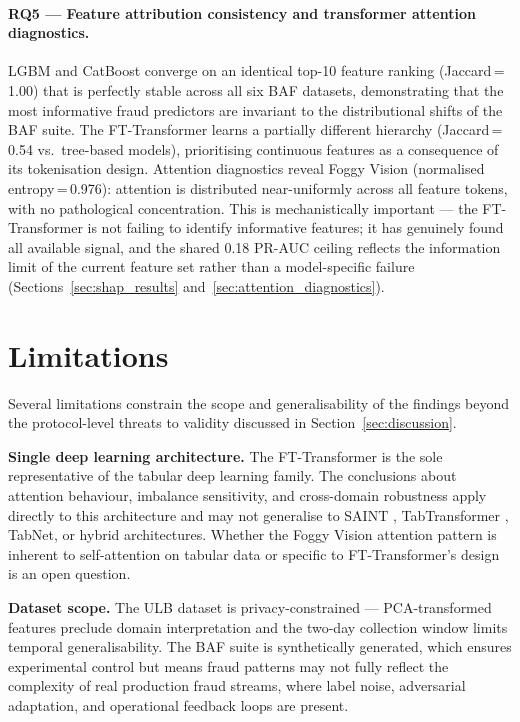 \paragraph{RQ5 — Feature attribution consistency and transformer attention diagnostics.}
LGBM and CatBoost converge on an identical top-10 feature ranking (Jaccard\,=\,1.00) that is perfectly stable across all six BAF datasets, demonstrating that the most informative fraud predictors are invariant to the distributional shifts of the BAF suite. The FT-Transformer learns a partially different hierarchy (Jaccard\,=\,0.54 vs.\ tree-based models), prioritising continuous features as a consequence of its tokenisation design. Attention diagnostics reveal Foggy Vision (normalised entropy\,=\,0.976): attention is distributed near-uniformly across all feature tokens, with no pathological concentration. This is mechanistically important — the FT-Transformer is not failing to identify informative features; it has genuinely found all available signal, and the shared 0.18 PR-AUC ceiling reflects the information limit of the current feature set rather than a model-specific failure (Sections~\ref{sec:shap_results} and~\ref{sec:attention_diagnostics}).

\section{Limitations}
\label{sec:limitations}

Several limitations constrain the scope and generalisability of the findings beyond the protocol-level threats to validity discussed in Section~\ref{sec:discussion}.

\textbf{Single deep learning architecture.} The FT-Transformer is the sole representative of the tabular deep learning family. The conclusions about attention behaviour, imbalance sensitivity, and cross-domain robustness apply directly to this architecture and may not generalise to SAINT \cite{somepalli2021saint}, TabTransformer \cite{huang2020tabtransformer}, TabNet, or hybrid architectures. Whether the Foggy Vision attention pattern is inherent to self-attention on tabular data or specific to FT-Transformer's design is an open question.

\textbf{Dataset scope.} The ULB dataset is privacy-constrained — PCA-transformed features preclude domain interpretation and the two-day collection window limits temporal generalisability. The BAF suite is synthetically generated, which ensures experimental control but means fraud patterns may not fully reflect the complexity of real production fraud streams, where label noise, adversarial adaptation, and operational feedback loops are present.

